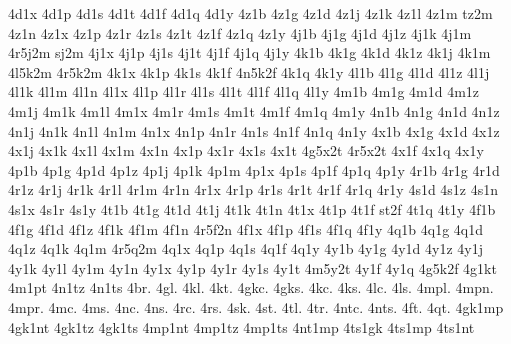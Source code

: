 {4d1x
4d1p
4d1s
4d1t
4d1f
4d1q
4d1y
4z1b %
4z1g %
4z1d
4z1j
4z1k
4z1l
4z1m
tz2m %
4z1n
4z1x
4z1p
4z1r
4z1s
4z1t
4z1f
4z1q
4z1y
4j1b
4j1g
4j1d
4j1z
4j1k
4j1m
4r5j2m %
sj2m   %
4j1x
4j1p
4j1s
4j1t
4j1f
4j1q
4j1y
4k1b %
4k1g
4k1d
4k1z
4k1j
4k1m
4l5k2m %
4r5k2m %
4k1x
4k1p
4k1s
4k1f
4n5k2f %
4k1q
4k1y
4l1b
4l1g
4l1d
4l1z
4l1j
4l1k
4l1m
4l1n
4l1x
4l1p
4l1r
4l1s
4l1t
4l1f
4l1q
4l1y
4m1b
4m1g
4m1d
4m1z
4m1j
4m1k
4m1l
4m1x
4m1r
4m1s
4m1t
4m1f
4m1q
4m1y
4n1b
4n1g
4n1d
4n1z
4n1j
4n1k
4n1l
4n1m
4n1x
4n1p
4n1r
4n1s
4n1f
4n1q
4n1y
4x1b
4x1g
4x1d
4x1z
4x1j
4x1k
4x1l
4x1m
4x1n
4x1p
4x1r
4x1s
4x1t
4g5x2t %
4r5x2t %
4x1f
4x1q
4x1y
4p1b
4p1g
4p1d
4p1z
4p1j
4p1k
4p1m
4p1x
4p1s
4p1f
4p1q
4p1y
4r1b
4r1g
4r1d
4r1z
4r1j
4r1k
4r1l
4r1m
4r1n
4r1x
4r1p
4r1s
4r1t
4r1f
4r1q
4r1y
4s1d %
4s1z 
4s1n %
4s1x
4s1r
4s1y
4t1b
4t1g
4t1d
4t1j
4t1k 
4t1n
4t1x
4t1p
4t1f
st2f %
4t1q
4t1y
4f1b
4f1g
4f1d
4f1z 
4f1k %
4f1m 
4f1n
4r5f2n %
4f1x
4f1p
4f1s
4f1q
4f1y
4q1b
4q1g
4q1d
4q1z
4q1k
4q1m
4r5q2m %
4q1x
4q1p
4q1s
4q1f
4q1y
4y1b
4y1g
4y1d
4y1z
4y1j
4y1k
4y1l
4y1m
4y1n
4y1x
4y1p
4y1r
4y1s
4y1t
4m5y2t %
4y1f
4y1q
4g5k2f %
4g1kt  %
4m1pt  %
4n1tz  %
4n1ts  %
4br.  %
4gl.  %
4kl.  %
4kt.  %
4gkc. %
4gks.
4kc.  %
4ks.
4lc.  %
4ls.
4mpl. %
4mpn. %
4mpr. %
4mc.  %
4ms.
4nc.  %
4ns.
4rc.  %
4rs.
4sk.  %
4st.  %
4tl.  %
4tr.  %
4ntc. %
4nts.
4ft.  %
4qt.  %
4gk1mp
4gk1nt
4gk1tz
4gk1ts
4mp1nt
4mp1tz
4mp1ts
4nt1mp
4ts1gk
4ts1mp
4ts1nt
} %
\endgroup
\endinput
